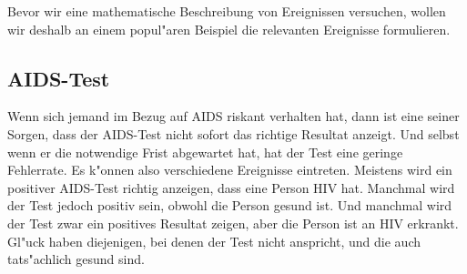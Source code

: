 Bevor wir eine mathematische Beschreibung von Ereignissen versuchen,
wollen wir deshalb an einem popul"aren Beispiel die relevanten Ereignisse
formulieren.

\subsection{AIDS-Test\label{aids-test-intro}}
Wenn sich jemand im Bezug auf AIDS riskant verhalten hat, dann ist
eine seiner Sorgen, dass der AIDS-Test nicht sofort das richtige
Resultat anzeigt. Und selbst wenn er die notwendige Frist abgewartet
hat, hat der Test eine geringe Fehlerrate.
Es k"onnen also verschiedene Ereignisse eintreten. Meistens wird ein
positiver AIDS-Test richtig anzeigen, dass eine Person HIV hat. Manchmal
wird der Test jedoch positiv sein, obwohl die Person gesund ist. Und manchmal
wird der Test zwar ein positives Resultat zeigen, aber die Person ist
an HIV erkrankt. Gl"uck haben diejenigen, bei denen der Test nicht
anspricht, und die auch tats"achlich gesund sind.


